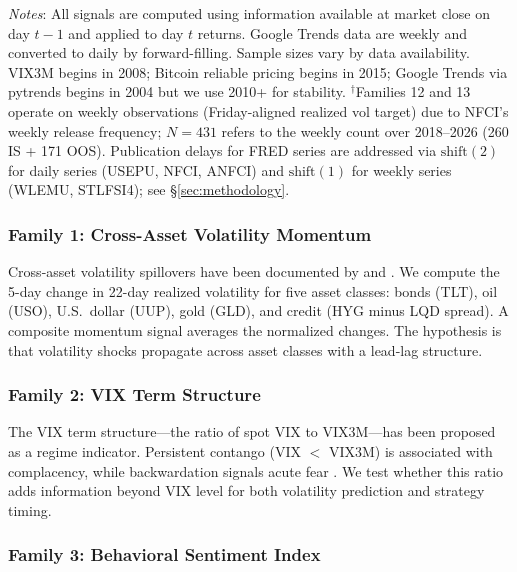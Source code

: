 \documentclass[12pt,a4paper]{article}
\begin{document}
\begin{table}[H]
\begin{threeparttable}
\begin{tablenotes}
\small
\item \textit{Notes}: All signals are computed using information available at market close on day $t-1$ and applied to day $t$ returns. Google Trends data are weekly and converted to daily by forward-filling. Sample sizes vary by data availability. VIX3M begins in 2008; Bitcoin reliable pricing begins in 2015; Google Trends via pytrends begins in 2004 but we use 2010+ for stability. $^\dagger$Families 12 and 13 operate on weekly observations (Friday-aligned realized vol target) due to NFCI's weekly release frequency; $N=431$ refers to the weekly count over 2018--2026 (260 IS + 171 OOS). Publication delays for FRED series are addressed via $\text{shift}(2)$ for daily series (USEPU, NFCI, ANFCI) and $\text{shift}(1)$ for weekly series (WLEMU, STLFSI4); see \S\ref{sec:methodology}.
\end{tablenotes}
\end{threeparttable}
\end{table}

\subsubsection{Family 1: Cross-Asset Volatility Momentum}

Cross-asset volatility spillovers have been documented by \citet{diebold2012} and \citet{barunik2016}. We compute the 5-day change in 22-day realized volatility for five asset classes: bonds (TLT), oil (USO), U.S.\ dollar (UUP), gold (GLD), and credit (HYG minus LQD spread). A composite momentum signal averages the normalized changes. The hypothesis is that volatility shocks propagate across asset classes with a lead-lag structure.

\subsubsection{Family 2: VIX Term Structure}

The VIX term structure---the ratio of spot VIX to VIX3M---has been proposed as a regime indicator. Persistent contango (VIX $<$ VIX3M) is associated with complacency, while backwardation signals acute fear \citep{luo2019}. We test whether this ratio adds information beyond VIX level for both volatility prediction and strategy timing.

\subsubsection{Family 3: Behavioral Sentiment Index}
\end{document}
